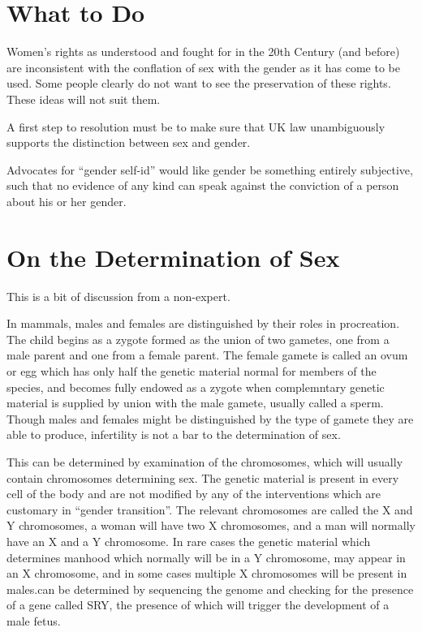\documentclass[10pt,titlepage]{article}
\begin{document}
\section{What to Do}

Women's rights as understood and fought for in the 20th Century (and before) are inconsistent with the conflation of sex with the gender as it has come to be used.
Some people clearly do not want to see the preservation of these rights.
These ideas will not suit them.

A first step to resolution must be to make sure that UK law unambiguously supports the distinction between sex and gender.

Advocates for ``gender self-id'' would like gender be something entirely subjective, such that no evidence of any kind can speak against the conviction of a person about his or her gender.


\appendix
\section{On the Determination of Sex}

This is a bit of discussion from a non-expert.

In mammals, males and females are distinguished by their roles in procreation.
The child begins as a zygote formed as the union of two gametes, one from a male parent and one from a female parent.
The female gamete is called an ovum or egg which has only half the genetic material normal for members of the species, and becomes fully endowed as a zygote when complemntary genetic material is supplied by union with the male gamete, usually called a sperm.
Though males and females might be distinguished by the type of gamete they are able to produce, infertility is not a bar to the determination of sex.

This can be determined by examination of the chromosomes, which will usually contain chromosomes determining sex.
The genetic material is present in every cell of the body and are not modified by any of the interventions which are customary in ``gender transition''.
The relevant chromosomes are called the X and Y chromosomes, a woman will have two X chromosomes, and a man will normally have an X and a Y chromosome.
In rare cases the genetic material which determines manhood which normally will be in a Y chromosome, may appear in an X chromosome, and in some cases multiple X chromosomes will be present in males.can be determined by sequencing the genome and checking for the presence of a gene called SRY, the presence of which will trigger the development of a male fetus.
\end{document}
